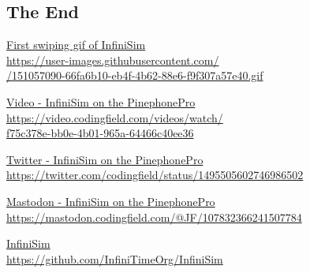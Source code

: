 \documentclass{beamer}
\begin{document}
\subsection{The End}
\begin{frame}{}

  \href{https://user-images.githubusercontent.com/9076163/151057090-66fa6b10-eb4f-4b62-88e6-f9f307a57e40.gif}{
    First swiping gif of InfiniSim\\
  \quad \small https://user-images.githubusercontent.com/\\
  \quad{}/151057090-66fa6b10-eb4f-4b62-88e6-f9f307a57e40.gif}

  \medskip
  \href{https://video.codingfield.com/videos/watch/f75c378e-bb0e-4b01-965a-64466c40ee36}{
    Video - InfiniSim on the PinephonePro\\
  \quad \small https://video.codingfield.com/videos/watch/\\
  \quad\quad f75c378e-bb0e-4b01-965a-64466c40ee36}

  \medskip
  \href{https://twitter.com/codingfield/status/1495505602746986502}{
    Twitter - InfiniSim on the PinephonePro\\
  \quad \small https://twitter.com/codingfield/status/1495505602746986502}

  \medskip
  \href{https://mastodon.codingfield.com/@JF/107832366241507784}{
    Mastodon - InfiniSim on the PinephonePro\\
  \quad \small https://mastodon.codingfield.com/@JF/107832366241507784}

  \medskip
  \href{https://github.com/InfiniTimeOrg/InfiniSim}{
    InfiniSim\\
  \quad \small https://github.com/InfiniTimeOrg/InfiniSim}

\end{frame}
\end{document}
